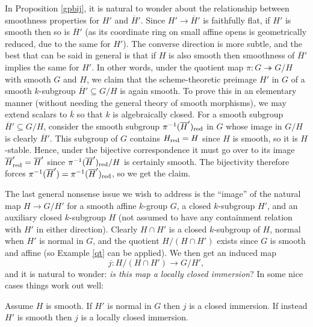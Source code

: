 \documentclass[10pt]{article}
\renewcommand{\(}{\left(}
\renewcommand{\)}{\right)}
\numberwithin{thm}{subsection}
\begin{document}
\begin{remark}\label{smoothqt}
In Proposition \ref{gpbij}, it is natural to wonder about the relationship between
smoothness properties for $H'$ and $\overline{H}'$.
Since $H' \rightarrow \overline{H}'$ is faithfully flat, 
if $H'$ is smooth then so is $\overline{H}'$
(as its coordinate ring on small affine opens is geometrically reduced,
due to the same for $H'$). The converse direction is more subtle, and the 
best that can be said in general is that if $H$ is also smooth then smoothness of
$\overline{H}'$ implies the same for $H'$.   In other words, under
the quotient map $\pi:G \twoheadrightarrow G/H$ with smooth $G$ and $H$, we claim
that the scheme-theoretic preimage $H'$ in $G$ of a smooth
$k$-subgroup $\overline{H}' \subseteq G/H$ is again smooth.
To prove this in an elementary manner (without needing the general theory of smooth morphisms),
we may extend scalars to $\overline{k}$ so that $k$ is algebraically closed.
For a smooth subgroup $\overline{H}' \subseteq G/H$, consider the smooth
subgroup $\pi^{-1}(\overline{H}')_{\rm{red}}$ in $G$ whose image in $G/H$ is clearly
$\overline{H}'$.  This subgroup of $G$ contains $H_{\rm{red}} = H$
since $H$ is smooth, so it is $H$-stable.  Hence, under the bijective
correspondence it must go over to its image $\overline{H}'_{\rm{red}} = \overline{H}'$
since $\pi^{-1}(\overline{H}')_{\rm{red}}/H$ is certainly smooth.  
The bijectivity therefore forces $\pi^{-1}(\overline{H}') = 
\pi^{-1}(\overline{H}')_{\rm{red}}$, so we get the claim.
\end{remark}

The last general nonsense issue we wish to address is the ``image'' of the natural map
$H \rightarrow G/H'$ for a smooth affine $k$-group $G$, a closed $k$-subgroup $H'$,
and an auxiliary closed $k$-subgroup $H$ (not assumed
to have any containment relation with $H'$ in either direction).   
Clearly $H \cap H'$ is a closed $k$-subgroup
of $H$, normal when $H'$ is normal in $G$,
and the quotient $H/(H \cap H')$ exists since $G$ is smooth and affine (so Example
\ref{qt} can be applied).  We then get an induced map
$$j:H/(H \cap H') \rightarrow G/H',$$ and it is natural to wonder: {\em is this map 
a locally closed immersion}?   In some nice cases things work out well:

\begin{proposition} Assume $H$ is smooth.
If $H'$ is normal in $G$ then $j$ is a closed immersion.
If instead $H'$ is smooth then $j$ is a locally closed immersion.
\end{proposition}
\end{document}
